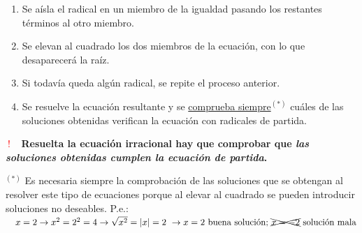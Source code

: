 \begin{theorem}


\begin{enumerate}

\item Se aísla el radical en un miembro de la igualdad pasando los restantes términos al otro miembro.


\item Se elevan al cuadrado los dos miembros de la ecuación, con lo que desaparecerá la raíz.


\item Si todavía queda algún radical, se repite el proceso anterior.


\item Se resuelve la ecuación resultante y se \underline{comprueba siempre}$^{(*)}$ cuáles de las soluciones obtenidas verifican la ecuación con radicales de partida.
\end{enumerate}

\vspace{5mm} 
\begin{destacado}
\begin{small}
 \textcolor{red}{$\boldsymbol{\boxed{ \ ! \ }} $}  $\ $ \textbf{Resuelta la ecuación irracional hay que comprobar que \emph{las soluciones obtenidas cumplen la ecuación de partida}.}
 \end{small}
 \end{destacado}

\end{theorem}

$^{(*)}$  Es necesaria siempre la comprobación de las soluciones que se obtengan al resolver este tipo de ecuaciones porque al elevar al cuadrado se pueden introducir soluciones no deseables. P.e.: $\quad x=2 \to x^2=2^2=4 \to \sqrt{x^2}=|x|=2 \ \to x=2 \text{ buena solución; } \cancel{\bcancel{x=-2}} \text{ solución mala}$

